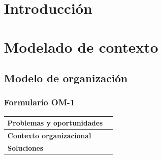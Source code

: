 \documentclass[a4paper,11pt]{article}
\begin{document}
	\newpage
	\tableofcontents
	\newpage
	\section{Introducción}
	\section{Modelado de contexto}
		\subsection{Modelo de organización}
			\subsubsection{Formulario OM-1}
			\begin{center}
				\begin{tabular}{| l | l |}
					\hline
					\textbf{Problemas y oportunidades} & \\
					\hline
					\textbf{Contexto organizacional} & \\
					\hline
					\textbf{Soluciones} & \\
					\hline
				\end{tabular}
			\end{center}
\end{document}
